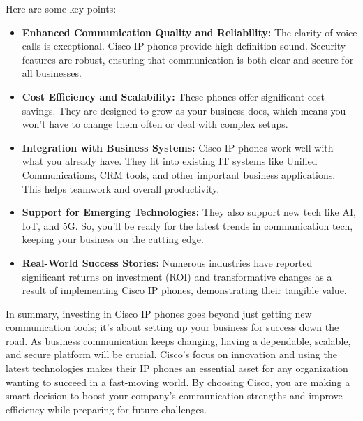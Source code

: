 \documentclass[11pt,a4paper]{article}
\begin{document}
Here are some key points:

\begin{itemize}
    \item \textbf{Enhanced Communication Quality and Reliability:} The clarity of voice calls is exceptional. Cisco IP phones provide high-definition sound. Security features are robust, ensuring that communication is both clear and secure for all businesses.
    \item \textbf{Cost Efficiency and Scalability:} These phones offer significant cost savings. They are designed to grow as your business does, which means you won’t have to change them often or deal with complex setups.
    \item \textbf{Integration with Business Systems:} Cisco IP phones work well with what you already have. They fit into existing IT systems like Unified Communications, CRM tools, and other important business applications. This helps teamwork and overall productivity.
    \item \textbf{Support for Emerging Technologies:} They also support new tech like AI, IoT, and 5G. So, you’ll be ready for the latest trends in communication tech, keeping your business on the cutting edge.
    \item \textbf{Real-World Success Stories:} Numerous industries have reported significant returns on investment (ROI) and transformative changes as a result of implementing Cisco IP phones, demonstrating their tangible value.
\end{itemize}

In summary, investing in Cisco IP phones goes beyond just getting new communication tools; it’s about setting up your business for success down the road. As business communication keeps changing, having a dependable, scalable, and secure platform will be crucial. Cisco's focus on innovation and using the latest technologies makes their IP phones an essential asset for any organization wanting to succeed in a fast-moving world. By choosing Cisco, you are making a smart decision to boost your company’s communication strengths and improve efficiency while preparing for future challenges.


\newpage

\begin{multicols}{2}
  \small
  
  \makeatletter
\renewcommand\@biblabel[1]{#1.} %
\makeatother
  
 
  \end{multicols}
\end{document}
